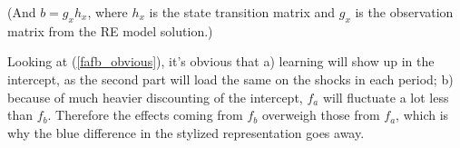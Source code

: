 \documentclass[11pt]{article}
\def \myFigPath {../figures/}
\renewcommand{\[}{\begin{equation}}
\renewcommand{\]}{\end{equation}}
\def\myMediumFigScale{0.25}
\begin{document}
(And $b = g_x h_x$, where $h_x$ is the state transition matrix and $g_x$ is the observation matrix from the RE model solution.)

Looking at (\ref{fafb_obvious}), it's obvious that a) learning will show up in the intercept, as the second part will load the same on the shocks in each period; b) because of much heavier discounting of the intercept, $f_a$ will fluctuate a lot less than $f_b$. Therefore the effects coming from $f_b$ overweigh those from $f_a$, which is why the blue difference in the stylized representation goes away. 


%
\end{document}
